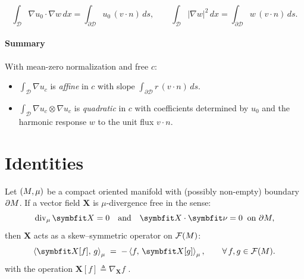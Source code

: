 $$
\int_{\mathscr D}\nabla u_0\cdot \nabla w\,dx
= \int_{\partial\mathscr D} u_0\,(v\!\cdot n)\,ds,\qquad
\int_{\mathscr D}|\nabla w|^2\,dx
= \int_{\partial\mathscr D} w\,(v\!\cdot n)\,ds.
$$

\paragraph{Summary}
With mean-zero normalization and free $c$:
\begin{itemize}
\item $\displaystyle \int_{\mathscr D}\nabla u_c$ is \emph{affine} in $c$ with slope $ \int_{\partial\mathscr D} r\,(v\!\cdot n)\,ds$.
\item $\displaystyle \int_{\mathscr D}\nabla u_c\otimes\nabla u_c$ is \emph{quadratic} in $c$ with coefficients determined by $u_0$ and the harmonic response $w$ to the unit flux $v\!\cdot n$.
\end{itemize}
\fi

\section{Identities}


%

\begin{proposition}
\label{prop:div-skew}
Let $(M,\mu)$ be a compact oriented manifold with (possibly non-empty) boundary $\partial M$.  
If a vector field $\bm{X}$ is $\mu$-divergence free in the sense:
\[
\operatorname{div}_{\mu} \bm{X} = 0
\quad\text{and}\quad
\bm{X}\cdot\bm{\nu} = 0 \;\; \text{on } \PlaneBoundary,
\]
then $\bm{X}$ acts as a skew–symmetric operator on $\mathcal{F}(M)$:
\[
\left< \bm{X}[f],\,g\right>_\mu \;=\; - \left<f,\,\bm{X}[g]\right>_{\mu} ,
\qquad\forall\,f,g\in\mathcal F(\PlaneManifold).
\]
with the operation \(\bm{X}[f] \triangleq \nabla_{\bm{X}} f\) .
\end{proposition}

